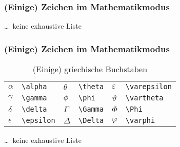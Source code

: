 \begin{frame}\frametitle{(Einige) Zeichen im Mathematikmodus}

\begin{table}
\caption{(Einige) Pfeile, Klammern, Schriften}
\centering
{}
\end{table}

 \hfill \dots\ keine exhaustive Liste
 
\end{frame}


\begin{frame}\frametitle{(Einige) Zeichen im Mathematikmodus}

\begin{table}
\caption{(Einige) griechische Buchstaben}
\centering
\begin{tabular}{ll|ll|ll}
$\alpha$ &	\texttt{\textbackslash alpha}	&$\theta$	&	\texttt{\textbackslash theta}	&$\varepsilon$	&	\texttt{\textbackslash varepsilon}	\\
$\gamma$&	\texttt{\textbackslash gamma}	&$\phi$	&	\texttt{\textbackslash phi}	&$\vartheta$	&	\texttt{\textbackslash vartheta}	\\
$\delta$&	\texttt{\textbackslash delta}	&$\Gamma$	&	\texttt{\textbackslash Gamma}	&$\Phi$	&	\texttt{\textbackslash Phi}	\\
$\epsilon$&	\texttt{\textbackslash epsilon}	&$\Delta$	&	\texttt{\textbackslash Delta}	&$\varphi$	&	\texttt{\textbackslash varphi}	\\
\end{tabular}
\end{table}

 \hfill \dots\ keine exhaustive Liste
 
\end{frame}


